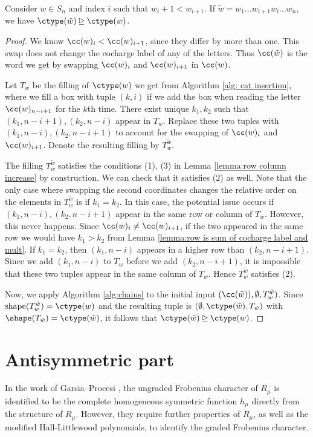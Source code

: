 \begin{prop}\label{prop: swaps raise ctype}
   Consider $w\in S_n$ and index $i$ such that $w_i  +1 < w_{i+1}$. If $\tilde{w} = w_1\dots w_{i+1}w_i\dots w_n$, we have $\ctype(\tilde{w}) \unrhd \ctype(w)$.
\end{prop}
\begin{proof}
    We know  $\cc(w)_i < \cc(w)_{i+1}$, since they differ by more than one. This swap does not change the cocharge label of any of the letters. 
    Thus $\cc(\tilde{w})$ is the word we get by swapping $\cc(w)_i$ and $\cc(w)_{i+1}$ in $\cc(w)$.

    Let $T_w$ be the filling of $\ctype(w)$ we get from Algorithm \ref{alg: cat insertion}, where we fill a box with tuple $(k,i)$ if we add the box when reading the letter $\cc(w)_{n-i + 1}$ for the $k$th time. There exist unique $k_1,k_2$ such that $(k_1,n-i+1), (k_2,n-i)$ appear in $T_w$. Replace these two tuples with  $(k_1,n-i), (k_2,n-i+1)$ to account for the swapping of $\cc(w)_i$ and $\cc(w)_{i+1}$. Denote the resulting filling by $T_{w}^{\tilde{w}}$.

    The filling $T_{w}^{\tilde{w}}$ satisfies the conditions (1), (3) in Lemma \ref{lemma:row column increase} by construction. We can check that it satisfies (2) as well. 
    Note that the only case where swapping the second coordinates changes the relative order on the elements in $T_{w}^{\tilde{w}}$ is if $k_1 = k_2$. 
    In this case, the potential issue occurs if $(k_1,n-i), (k_2,n-i+1)$ appear in the same row or column of $T_w$.
    However, this never happens. Since $\cc(w)_i \neq \cc(w)_{i+1}$, if the two appeared in the same row we would have $k_1 > k_2$ from Lemma \ref{lemma:row is sum of cocharge label and mult}.
    If $k_1 = k_2$, then $(k_1,n-i)$ appears in a higher row than $ (k_2,n-i+1)$. Since we add $(k_1,n-i)$ to $T_w$ before we add $(k_2,n-i+1)$, it is impossible that these two tuples appear in the same column of $T_w$. Hence $T_{w}^{\tilde{w}}$ satisfies (2).

    Now, we apply Algorithm \ref{alg:chains} to the initial input $(\cc(\tilde{w})), \emptyset, T_{w}^{\tilde{w}})$. 
    Since $\text{shape}(T_{w}^{\tilde{w}}) = \ctype(w)$ and the resulting tuple is $(\emptyset, \ctype(\tilde{w}), T_{\tilde{w}})$ with $\shape (T_{\tilde{w}}) = \ctype(\tilde{w})$, it follows that $\ctype(\tilde{w}) \unrhd \ctype(w)$. 
\end{proof}


\section{Antisymmetric part}\label{sec: remarks}
In the work of Garsia--Procesi \cite[Section 3]{GP}, the ungraded Frobenius character of $R_\mu$ is identified to be the complete homogeneous symmetric function $h_\mu$ directly from the structure of $R_\mu$. 
However, they require further properties of $R_\mu$, as well as the modified Hall-Littlewood polynomials, to identify the graded Frobenius character. 

